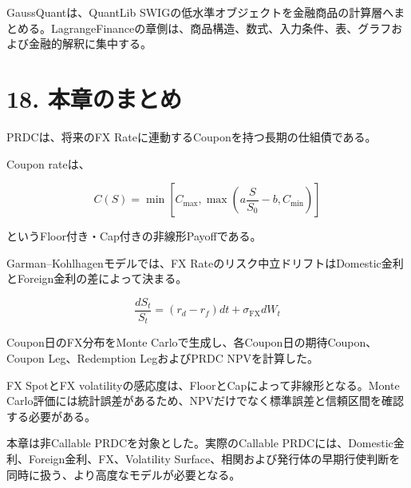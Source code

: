 \documentclass[
  letterpaper,
  DIV=11,
  numbers=noendperiod]{scrreprt}
\begin{document}
GaussQuantは、QuantLib
SWIGの低水準オブジェクトを金融商品の計算層へまとめる。LagrangeFinanceの章側は、商品構造、数式、入力条件、表、グラフおよび金融的解釈に集中する。

\section{18. 本章のまとめ}\label{ux672cux7ae0ux306eux307eux3068ux3081}

PRDCは、将来のFX Rateに連動するCouponを持つ長期の仕組債である。

Coupon rateは、

\[
C(S)
=
\min
\left[
C_{\max},
\max
\left(
a\frac{S}{S_0}-b,
C_{\min}
\right)
\right]
\]

というFloor付き・Cap付きの非線形Payoffである。

Garman--Kohlhagenモデルでは、FX
Rateのリスク中立ドリフトはDomestic金利とForeign金利の差によって決まる。

\[
\frac{dS_t}{S_t}
=
(r_d-r_f)dt
+
\sigma_{\mathrm{FX}}dW_t
\]

Coupon日のFX分布をMonte Carloで生成し、各Coupon日の期待Coupon、Coupon
Leg、Redemption LegおよびPRDC NPVを計算した。

FX SpotとFX volatilityの感応度は、FloorとCapによって非線形となる。Monte
Carlo評価には統計誤差があるため、NPVだけでなく標準誤差と信頼区間を確認する必要がある。

本章は非Callable PRDCを対象とした。実際のCallable
PRDCには、Domestic金利、Foreign金利、FX、Volatility
Surface、相関および発行体の早期行使判断を同時に扱う、より高度なモデルが必要となる。
\end{document}
